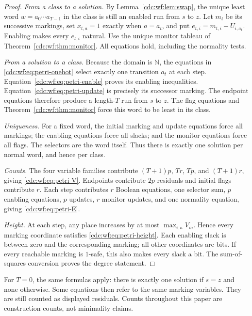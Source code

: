 \documentclass[11pt,a4paper]{article}
\theoremstyle{definition}
\theoremstyle{remark}
\newcommand{\N}{\mathbb N}
\begin{document}
\begin{proof}
\emph{From a class to a solution.} By Lemma~\ref{cdc:wf:lem:swap}, the unique least word $w=a_0\cdots a_{T-1}$ in the class is still an enabled run from $s$ to $z$. Let $m_t$ be its successive markings, set $x_{t,a}=1$ exactly when $a=a_t$, and put $e_{t,i}=m_{t,i}-U_{i,a_t}$. Enabling makes every $e_{t,i}$ natural. Use the unique monitor tableau of Theorem~\ref{cdc:wf:thm:monitor}. All equations hold, including the normality tests.

\emph{From a solution to a class.} Because the domain is $\N$, the equations in \eqref{cdc:wf:eq:petri-onehot} select exactly one transition $a_t$ at each step. Equation~\eqref{cdc:wf:eq:petri-enable} proves its enabling inequalities. Equation~\eqref{cdc:wf:eq:petri-update} is precisely its successor marking. The endpoint equations therefore produce a length-$T$ run from $s$ to $z$. The flag equations and Theorem~\ref{cdc:wf:thm:monitor} force this word to be least in its class.

\emph{Uniqueness.} For a fixed word, the initial marking and update equations force all markings; the enabling equations force all slacks; and the monitor equations force all flags. The selectors are the word itself. Thus there is exactly one solution per normal word, and hence per class.

\emph{Counts.} The four variable families contribute $(T+1)p$, $Tr$, $Tp$, and $(T+1)r$, giving \eqref{cdc:wf:eq:petri-V}. Endpoints contribute $2p$ residuals and initial flags contribute $r$. Each step contributes $r$ Boolean equations, one selector sum, $p$ enabling equations, $p$ updates, $r$ monitor updates, and one normality equation, giving \eqref{cdc:wf:eq:petri-E}.

\emph{Height.} At each step, any place increases by at most $\max_{i,a}V_{ia}$. Hence every marking coordinate satisfies \eqref{cdc:wf:eq:petri-height}. Each enabling slack is between zero and the corresponding marking; all other coordinates are bits. If every reachable marking is $1$-safe, this also makes every slack a bit. The sum-of-squares conversion proves the degree statement.
\end{proof}

For $T=0$, the same formulas apply: there is exactly one solution if $s=z$ and none otherwise. Some equations then refer to the same marking variables. They are still counted as displayed residuals. Counts throughout this paper are construction counts, not minimality claims.
\end{document}
